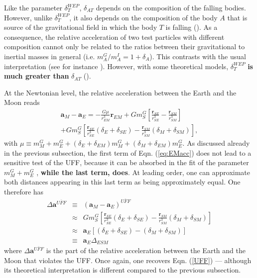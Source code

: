 \documentclass[fleqn,usenatbib,referee]{mnras}
\begin{document}
Like the parameter $\delta_T^{WEP}$, $\delta_{AT}$ depends on the composition of the falling bodies. However, unlike $\delta_T^{WEP}$, it also depends on the composition of the body $A$ that is source of the gravitational field in which the body $T$ is falling (\cite{hees:2015ax,minazzoli:2016pr}). As a consequence, the relative acceleration of two test particles with different composition cannot only be related to the ratios between their gravitational to inertial masses in general (i.e. $m_A^G/m_A^I=1+\delta_A$). This contrasts with the usual interpretation (see for instance\textbf{ \cite{Williams2012}}). However, with some theoretical models, $\delta_T^{WEP}$ \textbf{is much greater than} $\delta_{AT}$ (\cite{Damour2010,hees:2015ax,minazzoli:2016pr}).

At the Newtonian level, the relative acceleration between the Earth and the Moon reads
\begin{eqnarray}
\bm a_M - \bm a_E = -  \frac{ G \mu}{r_{EM}^3}\bm r_{EM}+   G m^G_S\left[ \frac{\bm r_{SE}}{r_{SE}^3}-\frac{\bm r_{SM}}{r_{SM}^3} \right] \nonumber \\
+   G  m^G_S\left[ \frac{\bm r_{SE}}{r_{SE}^3} (\delta_E+\delta_{SE})- \frac{\bm r_{SM}}{r_{SM}^3} (\delta_M+\delta_{SM}) \right], \label{eq:EMacc}
\end{eqnarray}
with $\mu\equiv  m^G_M +  m^G_E+ (\delta_E+\delta_{EM})m^G_M+(\delta_M+\delta_{EM}) m^G_E$. 
As discussed already in the previous subsection, the first term of Eqn. (\ref{eq:EMacc}) does not lead to a sensitive test of the UFF, because it can be absorbed in the fit of the parameter $m^G_M+m^G_E$ \citep[e.g.][]{Williams2012}, \textbf{while the last term, does}. At leading order, one can approximate both distances appearing in this last term as being approximately equal. One therefore has
\begin{eqnarray}
\Delta \bm a^{\overline{UFF}} &\equiv& (\bm a_M - \bm a_E)^{\overline{UFF}} \nonumber \\
&\approx&  G m^G_S\left[ \frac{\bm r_{SE}}{r_{SE}^3} (\delta_E+\delta_{SE})- \frac{\bm r_{SM}}{r_{SM}^3} (\delta_M+\delta_{SM}) \right] \nonumber \\
&\approx& \bm a_{E}  \left[(\delta_E+\delta_{SE})- (\delta_M+\delta_{SM})\right] \nonumber\\
&\equiv& \bm a_{E} \Delta_{ESM}
\end{eqnarray}
where  $\Delta \bm a^{\overline{UFF}}$ is the part of the relative acceleration between the Earth and the Moon that violates the UFF. Once again, one recovers Eqn. (\ref{UFF}) --- although its theoretical interpretation is different compared to the previous subsection.
\end{document}
